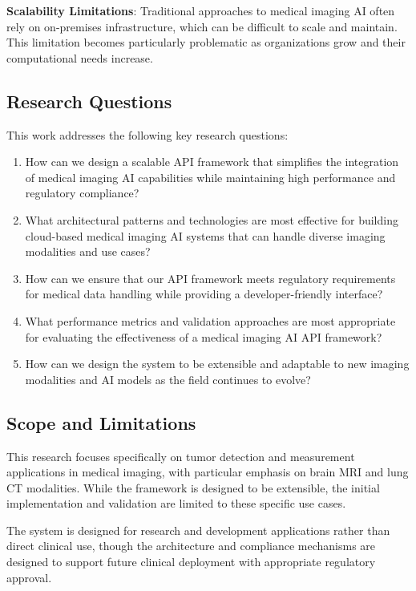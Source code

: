 \documentclass[12pt,a4paper]{article}
\begin{document}
\textbf{Scalability Limitations}: Traditional approaches to medical imaging AI often rely on on-premises infrastructure, which can be difficult to scale and maintain. This limitation becomes particularly problematic as organizations grow and their computational needs increase.

\subsection{Research Questions}

This work addresses the following key research questions:

\begin{enumerate}
    \item How can we design a scalable API framework that simplifies the integration of medical imaging AI capabilities while maintaining high performance and regulatory compliance?
    \item What architectural patterns and technologies are most effective for building cloud-based medical imaging AI systems that can handle diverse imaging modalities and use cases?
    \item How can we ensure that our API framework meets regulatory requirements for medical data handling while providing a developer-friendly interface?
    \item What performance metrics and validation approaches are most appropriate for evaluating the effectiveness of a medical imaging AI API framework?
    \item How can we design the system to be extensible and adaptable to new imaging modalities and AI models as the field continues to evolve?
\end{enumerate}

\subsection{Scope and Limitations}

This research focuses specifically on tumor detection and measurement applications in medical imaging, with particular emphasis on brain MRI and lung CT modalities. While the framework is designed to be extensible, the initial implementation and validation are limited to these specific use cases.

The system is designed for research and development applications rather than direct clinical use, though the architecture and compliance mechanisms are designed to support future clinical deployment with appropriate regulatory approval.
\end{document}
